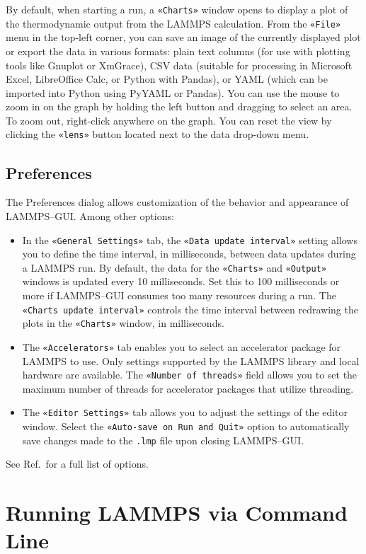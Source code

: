 \documentclass[9pt,tutorial]{livecoms}
\newcommand{\flecmd}[1]{\textcolor{command}{\texttt{#1}}} %
\newcommand{\guicmd}[1]{\textcolor{command}{\texttt{«#1»}}} %
\begin{document}
\begin{appendices}
By default, when starting a run, a \guicmd{Charts} window opens to display
a plot of the thermodynamic output from the LAMMPS calculation.  From the \guicmd{File}
menu in the top-left corner, you can save an image of the
currently displayed plot or export the data in various formats:
plain text columns (for use with plotting tools like Gnuplot or XmGrace),
CSV data (suitable for processing in Microsoft Excel, LibreOffice Calc,
or Python with Pandas), or YAML (which can be imported into Python using PyYAML or Pandas).
You can use the mouse to zoom in on the graph by holding the left button and dragging
to select an area.  To zoom out, right-click anywhere on the graph.  You can reset the view
by clicking the \guicmd{lens} button located next to the data drop-down menu.

\subsection{Preferences}

The Preferences dialog allows customization of the behavior and appearance of
LAMMPS--GUI. Among other options:
\begin{itemize}
\item In the \guicmd{General Settings} tab, the \guicmd{Data update interval} setting
allows you to define the time interval, in milliseconds, between data updates during
a LAMMPS run.  By default, the data for the \guicmd{Charts} and \guicmd{Output}
windows is updated every 10 milliseconds.  Set this to 100 milliseconds or more
if LAMMPS--GUI consumes too many resources during a run.  The \guicmd{Charts update interval}
controls the time interval between redrawing the plots in the \guicmd{Charts} window, in milliseconds.
\item The \guicmd{Accelerators} tab enables you to select an accelerator package
for LAMMPS to use.  Only settings supported by the LAMMPS library and local hardware
are available.  The \guicmd{Number of threads} field allows you to set the maximum
number of threads for accelerator packages that utilize threading.
\item The \guicmd{Editor Settings} tab allows you to adjust the settings of the editor
window.  Select the \guicmd{Auto-save on Run and Quit} option to automatically save changes
made to the \flecmd{.lmp} file upon closing LAMMPS--GUI.
\end{itemize}
See Ref.\, for a full list of options.

\section{Running LAMMPS via Command Line}
\label{command-line-label}


\end{appendices}
\end{document}
